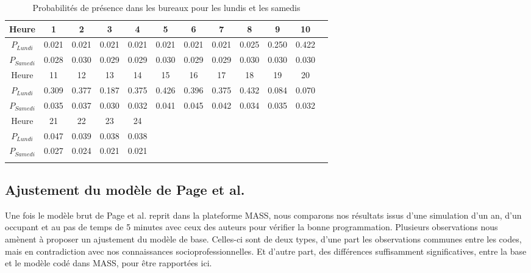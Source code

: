 \begin{table}[H]
\begin{tabular}{|c|c|c|c|c|c|c|c|c|c|c|c|}
\hline 
Heure & 1 & 2 & 3 & 4 & 5 & 6 & 7 & 8 & 9 & 10  \\ 
\hline 
$P_{Lundi}$ & 0.021 & 0.021 & 0.021 & 0.021 & 0.021 & 0.021 & 0.021 & 0.025 & 0.250 & 0.422  \\ 
\hline 
$P_{Samedi}$ & 0.028 & 0.030 & 0.029 & 0.029 & 0.030 & 0.029 & 0.029 & 0.030 & 0.030 & 0.030  \\ 
\hline
Heure & 11 & 12 & 13 & 14 & 15 & 16 & 17 & 18 & 19 & 20 \\ 
\hline 
$P_{Lundi}$ & 0.309 & 0.377 & 0.187 & 0.375 & 0.426 & 0.396 & 0.375 & 0.432 & 0.084 & 0.070 \\ 
\hline 
$P_{Samedi}$ & 0.035 & 0.037 & 0.030 & 0.032 & 0.041 & 0.045 & 0.042 & 0.034 & 0.035 & 0.032 \\ 
\hline 
Heure & 21 & 22 & 23 & 24 & \cellcolor{lightgray}& \cellcolor{lightgray}& \cellcolor{lightgray}& \cellcolor{lightgray}& \cellcolor{lightgray}& \cellcolor{lightgray}\\ 
\hline 
$P_{Lundi}$ & 0.047 & 0.039 & 0.038 & 0.038 & \cellcolor{lightgray} &\cellcolor{lightgray} &\cellcolor{lightgray} &\cellcolor{lightgray} &\cellcolor{lightgray} & \cellcolor{lightgray}\\ 
\hline 
$P_{Samedi}$ & 0.027 & 0.024 & 0.021 & 0.021 &\cellcolor{lightgray} &\cellcolor{lightgray} &\cellcolor{lightgray} & \cellcolor{lightgray}&\cellcolor{lightgray} &\cellcolor{lightgray} \\
\hline 
\label{PPage}
\end{tabular}
\caption{Probabilités de présence dans les bureaux pour les lundis et les samedis}
\end{table}

\subsection{Ajustement du modèle de Page et al.}
\label{AjustementPage}

Une fois le modèle brut de Page et al. \cite{Page-08} reprit dans la plateforme MASS, nous comparons nos résultats issus d'une simulation d'un an, d'un occupant et au pas de temps de 5 minutes avec ceux des auteurs pour vérifier la bonne programmation. Plusieurs observations nous amènent à proposer un ajustement du modèle de base. Celles-ci sont de deux types, d'une part les observations communes entre les codes, mais en contradiction avec nos connaissances socioprofessionnelles. Et d'autre part, des différences suffisamment significatives, entre la base et le modèle codé dans MASS, pour être rapportées ici.

